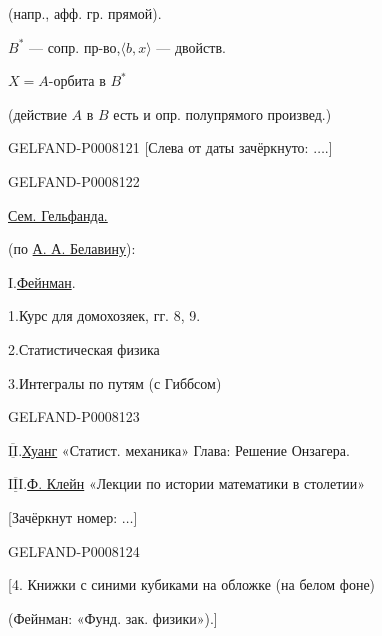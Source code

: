 (напр., афф. гр. прямой).

\(B^*\) — сопр. пр-во,\qquad \(\langle b,x\rangle\) — двойств.

\(X=A\)-орбита в \(B^*\)

(действие \(A\) в \(B\) есть и опр. полупрямого произвед.)


\begin{GelfandAdjacentEvidence}{GELFAND-P000812}{1}
[Слева от даты зачёркнуто: \(\ldots\).]
\end{GelfandAdjacentEvidence}
\begin{GelfandAdjacentEvidence}{GELFAND-P000812}{2}


\qquad \uline{Сем. Гельфанда.}

 (по \uline{А. А. Белавину}):

I.\quad \uline{Фейнман}.

\hspace{1em}1.\quad Курс для домохозяек, гг. 8, 9.

\hspace{1em}2.\quad Статистическая физика

\hspace{1em}3.\quad Интегралы по путям (с Гиббсом)
\end{GelfandAdjacentEvidence}
\begin{GelfandAdjacentEvidence}{GELFAND-P000812}{3}


\(\overline{\underline{\mathrm{II}}}\).\quad \uline{Хуанг} «Статист. механика» Глава: Решение Онзагера.

\(\overline{\underline{\mathrm{III}}}\).\quad \uline{Ф. Клейн} «Лекции по истории математики в  столетии»

[Зачёркнут номер: \(\ldots\)]
\end{GelfandAdjacentEvidence}
\begin{GelfandAdjacentEvidence}{GELFAND-P000812}{4}

[4. Книжки с синими кубиками на обложке (на белом фоне)

\hspace{1em}(Фейнман: «Фунд. зак. физики»).]

\end{GelfandAdjacentEvidence}

